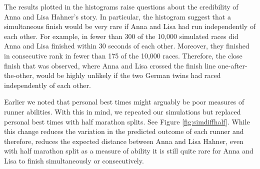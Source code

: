 \documentclass[12pt,titlepage]{article}
\begin{document}
The results plotted in the histograms raise questions about the
credibility of Anna and Lisa Hahner's story.  In particular, the
histogram suggest that a simultaneous finish would be very rare if
Anna and Lisa had run independently of each other.  For example, in
fewer than 300 of the 10,000 simulated races did Anna and Lisa
finished within 30 seconds of each other.  Moreover, they finished in
consecutive rank in fewer than 175 of the 10,000 races.  Therefore,
the close finish that was observed, where Anna and Lisa crossed the
finish line one-after-the-other, would be highly unlikely if the two
German twins had raced independently of each other.

Earlier we noted that personal best times might arguably be poor
measures of runner abilities.  With this in mind, we repeated our
simulations but replaced personal best times with half marathon
splits.  See Figure \ref{fig:simdiffhalf}.  While this change reduces
the variation in the predicted outcome of each runner and therefore,
reduces the expected distance between Anna and Lisa Hahner, even with
half marathon split as a measure of ability it is still quite rare for
Anna and Lisa to finish simultaneously or consecutively.
\end{document}
